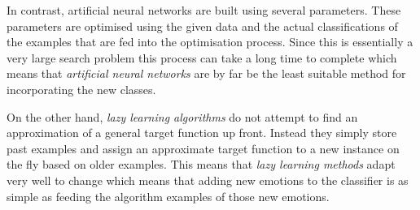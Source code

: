\documentclass[10pt,a4paper]{article}
\begin{document}
In contrast, artificial neural networks are built using several parameters. These parameters are optimised using the given data and the actual classifications of the examples that are fed into the optimisation process. Since this is essentially a very large search problem this process can take a long time to complete which means that \emph{artificial neural networks} are by far be the least suitable method for incorporating the new classes.

On the other hand, \emph{lazy learning algorithms} do not attempt to find an approximation of a general target function up front. Instead they simply store past examples and assign an approximate target function to a new instance on the fly based on older examples. This means that \emph{lazy learning methods} adapt very well to change which means that adding new emotions to the classifier is as simple as feeding the algorithm examples of those new emotions.



\end{document}
